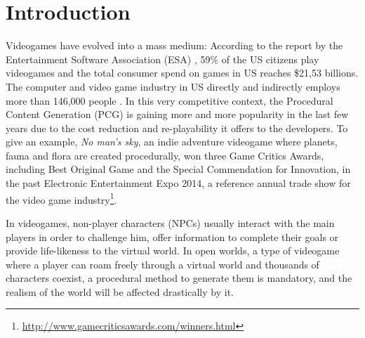 \documentclass[conference]{IEEEtran}
\begin{document}
\section{Introduction}
\label{sec:intro}

Videogames have evolved into a mass medium: According to the report by
the Entertainment Software Association (ESA) \cite{esa_ef_2014}, 59\%
of the US citizens play videogames and the total consumer spend on
games in US reaches \$21,53 billions. The computer and video game
industry in US directly and indirectly employs more than 146,000
people \cite{esa_century_2014}. In this very competitive context, the
Procedural Content Generation (PCG) is gaining more and more
popularity in the last few years due to the cost reduction and
re-playability it offers to the developers. To give an example,
\textit{No man's sky}, an indie adventure videogame where planets,
fauna and flora are created procedurally, won three Game Critics
Awards, including Best Original Game and the Special Commendation for
Innovation, in the past Electronic Entertainment Expo 2014, a
reference annual trade show for the video game
industry\footnote{\url{http://www.gamecriticsawards.com/winners.html}}. 

In videogames, non-player characters (NPCs) usually interact with the main
players in order to challenge him, offer information to complete their
goals or
provide life-likeness to the virtual world. In open worlds, a type of videogame where a player can roam freely through a virtual world and thousands of characters coexist, a procedural method to generate
them is mandatory, and the realism of the world will be affected
drastically by it.
\end{document}
